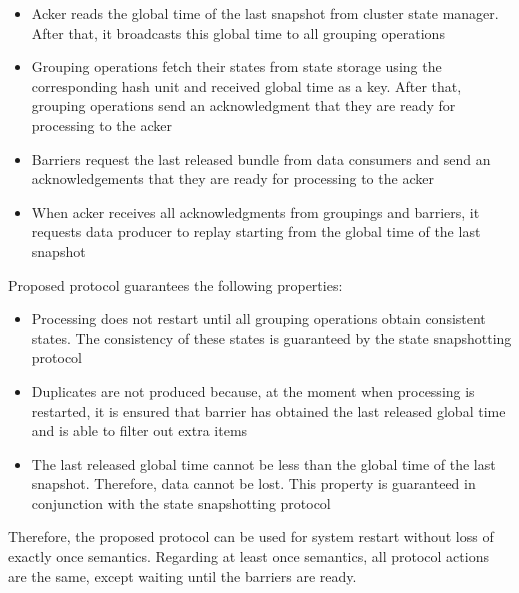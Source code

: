 \begin{itemize}
    \item Acker reads the global time of the last snapshot from cluster state manager. After that, it broadcasts this global time to all grouping operations
    \item Grouping operations fetch their states from state storage using the corresponding hash unit and received global time as a key. After that, grouping operations send an acknowledgment that they are ready for processing to the acker 
    \item Barriers request the last released bundle from data consumers and send an acknowledgements that they are ready for processing to the acker
    \item When acker receives all acknowledgments from groupings and barriers, it requests data producer to replay starting from the global time of the last snapshot  
\end{itemize}

Proposed protocol guarantees the following properties:

\begin{itemize}
    \item Processing does not restart until all grouping operations obtain consistent states. The consistency of these states is guaranteed by the state snapshotting protocol
    \item Duplicates are not produced because, at the moment when processing is restarted, it is ensured that barrier has obtained the last released global time and is able to filter out extra items
    \item The last released global time cannot be less than the global time of the last snapshot. Therefore, data cannot be lost. This property is guaranteed in conjunction with the state snapshotting protocol
\end{itemize}

Therefore, the proposed protocol can be used for system restart without loss of exactly once semantics. Regarding at least once semantics, all protocol actions are the same, except waiting until the barriers are ready.

